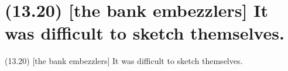 \documentclass{article}
\begin{document}
\clearpage

%
%

\section*{(13.20) [the bank embezzlers] It was difficult to sketch themselves.}

\bigbreak
\begin{enumerate*}
\item[(13.20)] [the bank embezzlers] It was difficult to sketch themselves.
\end{enumerate*}
\bigbreak
\end{document}

